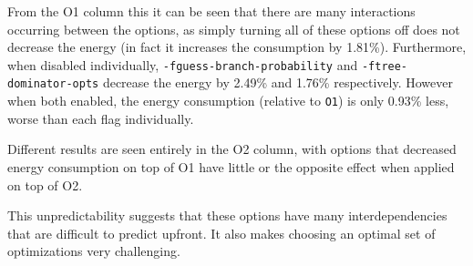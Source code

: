 \documentclass[twocolumn]{article}
\begin{document}
From the O1 column this it can be seen that there are many interactions occurring between the options, as simply turning all of these options off does not decrease the energy (in fact it increases the consumption by 1.81\%). Furthermore, when disabled individually, \texttt{-fguess-branch-probability} and \texttt{-ftree-dominator-opts} decrease the energy by 2.49\% and 1.76\% respectively. However when both enabled, the energy consumption (relative to \texttt{O1}) is only 0.93\% less, worse than each flag individually.

Different results are seen entirely in the O2 column, with options that decreased energy consumption on top of O1 have little or the opposite effect when applied on top of O2.

This unpredictability suggests that these options have many interdependencies that are difficult to predict upfront. It also makes choosing an optimal set of optimizations very challenging.


\end{document}
